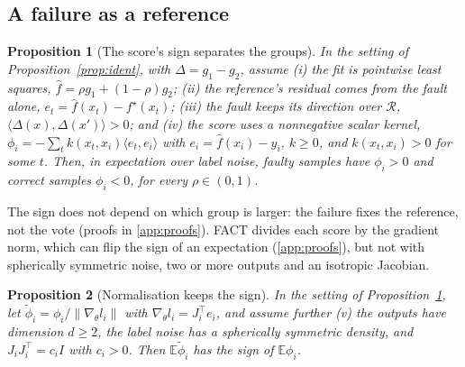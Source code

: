 \documentclass[preprint,12pt]{elsarticle}
\newcommand{\method}{FACT}
\newcommand{\E}{\mathbb{E}}
\newtheorem{proposition}{Proposition}
\begin{document}
\subsection{A failure as a reference}

\begin{proposition}[The score's sign separates the groups]\label{prop:sign}
In the setting of Proposition~\ref{prop:ident}, with $\Delta=g_1-g_2$, assume (i) the fit is pointwise least squares, $\hat f=\rho g_1+(1-\rho)g_2$; (ii) the reference's residual comes from the fault alone, $e_t=\hat f(x_t)-f^\star(x_t)$; (iii) the fault keeps its direction over $\mathcal{R}$, $\langle\Delta(x),\Delta(x')\rangle>0$; and (iv) the score uses a nonnegative scalar kernel, $\phi_i=-\sum_t k(x_t,x_i)\langle e_t,e_i\rangle$ with $e_i=\hat f(x_i)-y_i$, $k\ge0$, and $k(x_t,x_i)>0$ for some $t$. Then, in expectation over label noise, faulty samples have $\phi_i>0$ and correct samples $\phi_i<0$, for every $\rho\in(0,1)$.
\end{proposition}

The sign does not depend on which group is larger: the failure fixes the reference, not the vote (proofs in \ref{app:proofs}). \method{} divides each score by the gradient norm, which can flip the sign of an expectation (\ref{app:proofs}), but not with spherically symmetric noise, two or more outputs and an isotropic Jacobian.

\begin{proposition}[Normalisation keeps the sign]\label{prop:norm}
In the setting of Proposition~\ref{prop:sign}, let $\tilde\phi_i=\phi_i/\|\nabla_\theta l_i\|$ with $\nabla_\theta l_i=J_i^\top e_i$, and assume further (v) the outputs have dimension $d\ge2$, the label noise has a spherically symmetric density, and $J_iJ_i^\top=c_iI$ with $c_i>0$. Then $\E\tilde\phi_i$ has the sign of $\E\phi_i$.
\end{proposition}
\end{document}
